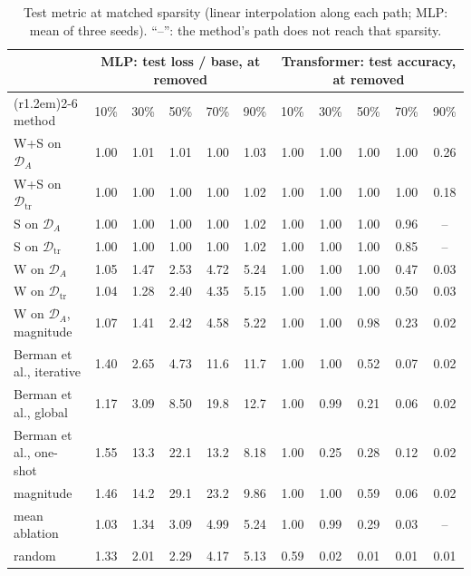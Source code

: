 \documentclass[11pt,a4paper]{article}
\theoremstyle{definition}
\newcommand{\D}{\mathcal{D}}
\newcommand{\Dtr}{\D_{\mathrm{tr}}}
\newcommand{\DA}{\D_{A}}
\newcommand{\WS}{\textsf{W+S}}
\newcommand{\Wo}{\textsf{W}}
\newcommand{\So}{\textsf{S}}
\begin{document}
\begin{table}[t]
\centering\small
\caption{Test metric at matched sparsity (linear interpolation along each path; MLP: mean
of three seeds). ``--'': the method's path does not reach that sparsity.}
\label{tab:matched}
\setlength{\tabcolsep}{4.2pt}
\begin{tabular}{@{}lccccc@{\hspace{1.0em}}ccccc@{}}
\toprule
& \multicolumn{5}{c}{MLP: test loss / base, at removed} & \multicolumn{5}{c}{Transformer: test accuracy, at removed}\\
\cmidrule(r{1.2em}){2-6}\cmidrule{7-11}
method & 10\% & 30\% & 50\% & 70\% & 90\% & 10\% & 30\% & 50\% & 70\% & 90\%\\
\midrule
\WS{} on $\DA$ & 1.00 & 1.01 & 1.01 & 1.00 & 1.03 & 1.00 & 1.00 & 1.00 & 1.00 & 0.26\\
\WS{} on $\Dtr$ & 1.00 & 1.00 & 1.00 & 1.00 & 1.02 & 1.00 & 1.00 & 1.00 & 1.00 & 0.18\\
\So{} on $\DA$ & 1.00 & 1.00 & 1.00 & 1.00 & 1.02 & 1.00 & 1.00 & 1.00 & 0.96 & --\\
\So{} on $\Dtr$ & 1.00 & 1.00 & 1.00 & 1.00 & 1.02 & 1.00 & 1.00 & 1.00 & 0.85 & --\\
\Wo{} on $\DA$ & 1.05 & 1.47 & 2.53 & 4.72 & 5.24 & 1.00 & 1.00 & 1.00 & 0.47 & 0.03\\
\Wo{} on $\Dtr$ & 1.04 & 1.28 & 2.40 & 4.35 & 5.15 & 1.00 & 1.00 & 1.00 & 0.50 & 0.03\\
\Wo{} on $\DA$, magnitude & 1.07 & 1.41 & 2.42 & 4.58 & 5.22 & 1.00 & 1.00 & 0.98 & 0.23 & 0.02\\
\midrule
Berman et al., iterative & 1.40 & 2.65 & 4.73 & 11.6 & 11.7 & 1.00 & 1.00 & 0.52 & 0.07 & 0.02\\
Berman et al., global & 1.17 & 3.09 & 8.50 & 19.8 & 12.7 & 1.00 & 0.99 & 0.21 & 0.06 & 0.02\\
Berman et al., one-shot & 1.55 & 13.3 & 22.1 & 13.2 & 8.18 & 1.00 & 0.25 & 0.28 & 0.12 & 0.02\\
magnitude & 1.46 & 14.2 & 29.1 & 23.2 & 9.86 & 1.00 & 1.00 & 0.59 & 0.06 & 0.02\\
mean ablation & 1.03 & 1.34 & 3.09 & 4.99 & 5.24 & 1.00 & 0.99 & 0.29 & 0.03 & --\\
random & 1.33 & 2.01 & 2.29 & 4.17 & 5.13 & 0.59 & 0.02 & 0.01 & 0.01 & 0.01\\
\bottomrule
\end{tabular}
\end{table}
\end{document}
